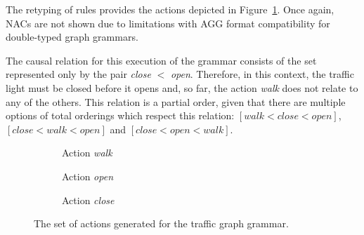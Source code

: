 The retyping of rules provides the actions depicted in Figure~\ref{fig:tests:actions-traffic}. Once again, NACs are not shown due to limitations with AGG format compatibility for double-typed graph grammars.

The causal relation for this execution of the grammar consists of the set represented only by the pair \emph{close} $<$ \emph{open}. Therefore, in this context, the traffic light must be closed before it opens and, so far, the action \emph{walk} does not relate to any of the others. This relation is a partial order, given that there are multiple options of total orderings which respect this relation: $[walk < close < open]$, $[close < walk < open]$ and $[close < open < walk]$.

\begin{figure}[!ht]
  \centering
  \begin{subfigure}[t]{.5\textwidth}
    \centerline{}
    \caption{Action \emph{walk}}
  \end{subfigure}
  \begin{subfigure}[t]{.5\textwidth}
    \centerline{}
    \caption{Action \emph{open}}
  \end{subfigure}
  \begin{subfigure}[t]{.5\textwidth}
    \centerline{}
    \caption{Action \emph{close}}
  \end{subfigure}
  \caption{The set of actions generated for the traffic graph grammar.}\label{fig:tests:actions-traffic}
\end{figure}

